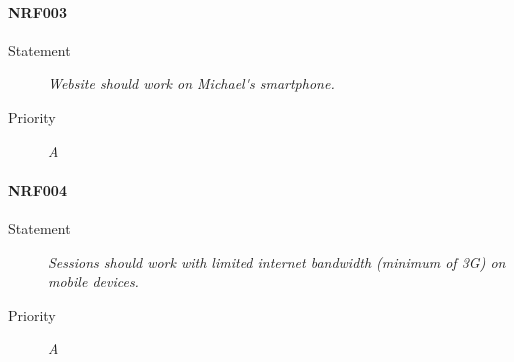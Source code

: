 \paragraph{NRF003}
\begin{description}
  \item [Statement] 
    \textit{Website should work on \gls{Michael's smartphone}.}
  \item [Priority] \textit{A}
\end{description}

\paragraph{NRF004}
\begin{description}
  \item [Statement] 
    \textit{\gls{Session}s should work with limited internet bandwidth (minimum of \gls{3G}) on mobile devices.}
  \item [Priority] \textit{A}
\end{description}
